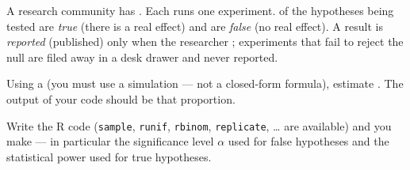 \question[16]{}

A research community has . Each runs one experiment.  of the hypotheses being tested are \emph{true} (there is a real effect) and  are \emph{false} (no real effect). A result is \emph{reported} (published) only when the researcher ; experiments that fail to reject the null are filed away in a desk drawer and never reported.

Using a  (you must use a simulation --- not a closed-form formula), estimate . The output of your code should be that proportion.

Write the R code (\verb|sample|, \verb|runif|, \verb|rbinom|, \verb|replicate|, \dots{} are available) and  you make --- in particular the significance level $\alpha$ used for false hypotheses and the statistical power used for true hypotheses.

\ifanswerspace
\vfillstretch
\fi
